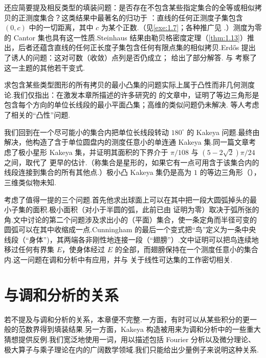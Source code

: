 还应简要提及相反类型的填装问题：是否存在不包含某些指定集合的全等或相似拷贝的正测度集合？这类结果中最著名的归功于 \textcite{steinhaus1920}：直线的任何正测度子集包含 $(0,c)$ 中的一切距离，其中 $c$ 为某个正数.（见\cref{exe:1.7}；各种推广见 \textcites{besicovitchmiller1948,besicovitch1948,eggleston1949,besicovitchtaylor1952}.）测度为零的 Cantor 集也具有这一性质.Steinhaus 结果由勒贝格密度定理（\cref{thm:1.13}）推出，后者还蕴含直线的任何正长度子集包含任何有限点集的相似拷贝.Erdős 提出了诱人的问题：这对可数（收敛）点列是否仍成立；\textcite{falconer1984} 给出了部分解答.\textcite{daviesmarstrandtaylor1960} 与 \textcite{darstgoffman1970} 考察了这一主题的其他若干变式.

求包含某些类型图形的所有拷贝的最小凸集的问题实际上属于凸性而非几何测度论.我们仅指出：在激发本章所描述的许多研究的 \textcite{pal1921} 的文章中，证明了等边三角形是包含每个方向的单位长线段的最小平面凸集；高维的类似问题仍未解决.\textcite{eggleston1957,besicovitch1965b,wetzel1973} 等人考虑了相关的``凸性''问题.

我们回到在一个尽可能小的集合内把单位长线段转动 $180^{\circ}$ 的 Kakeya 问题.最终由 \textcite{cunningham1971} 解决，他构造了含于单位圆盘内的测度任意小的单连通 Kakeya 集.同一篇文章考虑了极小星形 Kakeya 集，并证明其面积的下界介于 $\pi/108$ 与 $(5-2\sqrt{2})\pi/24$ 之间，取代了 \textcite{walker1952,blank1963,cunninghamschoenberg1965} 更早的估计.（称集合是星形的，如果它有一点可用含于该集合内的线段连接到集合的所有其他点.）极小凸 Kakeya 集仍是高为 $1$ 的等边三角形（\citeyear{pal1921}），三维类似物未知.

\textcite{cunningham1974} 考虑了值得一提的三个问题.首先他求出球面上可以在其中把一段大圆弧掉头的最小子集的面积.极小面积（对小于半圆的弧，此前已由 \textcite{wilker1971} 证明为零）取决于弧所张的角.文中讨论的第二个问题涉及求出小的（平面）集合，使一条定角而半径可变的圆弧可以在其中收缩成一点.Cunningham 的最后一个变式把``鸟''定义为一条中央线段（``身体'')，其两端各非刚性地连接一段（``翅膀''）.文中证明可以把鸟连续地移过任何有界集 $E$，使身体经过 $E$ 的全部，而翅膀保持在一个测度任意小的集合内.这一问题在调和分析中有应用，并与 \textcite{davies1952a} 关于线性可达集的工作密切相关.

\section{与调和分析的关系}

若不提及与调和分析的关系，本章便不完整.一方面，有时可以从某些积分的更一般的范数界得到填装结果.另一方面，Kakeya 构造被用来为调和分析中的一些重大猜想提供反例.我们宽泛地使用一词，用以描述包括 Fourier 分析以及微分理论、极大算子与乘子理论在内的广阔数学领域.我们只能给出少量例子来说明这种关系.

